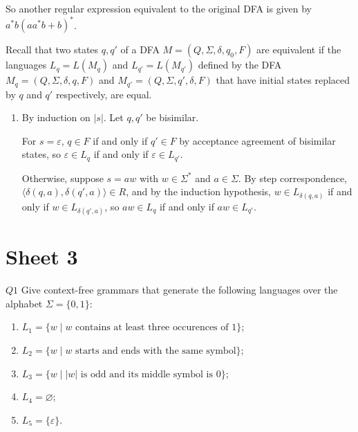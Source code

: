 \documentclass{article}
\theoremstyle{definition}
\theoremstyle{definition}
\theoremstyle{remark}
\begin{document}
\begin{enumerate}
\begin{center}
    \end{center}
    So another regular expression equivalent to the original DFA is given by $a^\ast b(aa^\ast b+b)^\ast$.
\end{enumerate}


Recall that two states $q,q'$ of a DFA $M=(Q,\Sigma,\delta,q_0,F)$ are equivalent if the languages $L_q=L(M_q)$ and $L_{q'}=L(M_{q'})$ defined by the DFA $M_q=(Q,\Sigma,\delta,q,F)$ and $M_{q'}=(Q,\Sigma,q',\delta,F)$ that have initial states replaced by $q$ and $q'$ respectively, are equal.

\begin{enumerate}
    \item[$(iii)$] By induction on $|s|$. Let $q,q'$ be bisimilar.
    
    For $s=\varepsilon$, $q\in F$ if and only if $q'\in F$ by acceptance agreement of bisimilar states, so $\varepsilon\in L_q$ if and only if $\varepsilon\in L_{q'}$.

    Otherwise, suppose $s=aw$ with $w\in\Sigma^\ast$ and $a\in\Sigma$. By step correspondence, $\bigl\langle\delta(q,a),\delta(q',a)\bigr\rangle\in R$, and by the induction hypothesis, $w\in L_{\delta(q,a)}$ if and only if $w\in L_{\delta(q',a)}$, so $aw\in L_q$ if and only if $aw\in L_{q'}$.
\end{enumerate}




















\newpage

\section{Sheet 3}

\begin{questionbox}{$Q1$}
    Give context-free grammars that generate the following languages over the alphabet $\Sigma=\{0,1\}$:
    \begin{enumerate}
        \item[$(i)$] $L_1=\{w\mid w\text{ contains at least three occurences of }1\}$;
        
        \item[$(ii)$] $L_2=\{w\mid w\text{ starts and ends with the same symbol}\}$;
        
        \item[$(iii)$] $L_3=\{w\mid |w|\text{ is odd and its middle symbol is }0\}$;

        \item[$(iv)$] $L_4=\varnothing$;

        \item[$(v)$] $L_5=\{\varepsilon\}$.
    \end{enumerate}
\end{questionbox}
\end{document}

